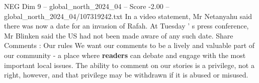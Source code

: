 \begin{textsample}{NEG Dim 9 – global\_north\_2024\_04 – Score -2.00 – global\_north\_2024\_04/107319242.txt}
In a video statement, Mr Netanyahu said there was now a date for an invasion of Rafah.
At Tuesday ' s press conference, Mr Blinken said the US had not been made aware of any such date.
Share Comments : Our rules We want our comments to be a lively and valuable part of our community - a place where \textbf{readers} can debate and engage with the most important local issues.
The ability to comment on our stories is a privilege, not a right, however, and that privilege may be withdrawn if it is abused or misused.

\end{textsample}
